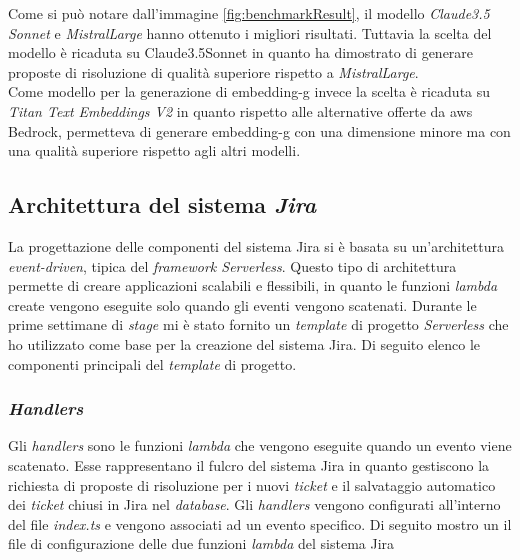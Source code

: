 Come si può notare dall'immagine \ref{fig:benchmarkResult}, il modello \textit{Claude3.5 Sonnet} e \textit{MistralLarge} hanno ottenuto i migliori risultati. Tuttavia la scelta del modello è ricaduta su Claude3.5Sonnet in quanto ha dimostrato di generare proposte di risoluzione di qualità superiore rispetto a \textit{MistralLarge}.\\
Come modello per la generazione di \gls{embedding-g} invece la scelta è ricaduta su \textit{Titan Text Embeddings V2} in quanto rispetto alle alternative offerte da \gls{aws} Bedrock, permetteva di generare \gls{embedding-g} con una dimensione minore ma con una qualità superiore rispetto agli altri modelli.

\subsection{Architettura del sistema \textit{Jira}}
La progettazione delle componenti del sistema Jira si è basata su un'architettura \textit{event-driven}, tipica del \textit{framework Serverless}. Questo tipo di architettura permette di creare applicazioni scalabili e flessibili, in quanto le funzioni \textit{lambda} create vengono eseguite solo quando gli eventi vengono scatenati. 
Durante le prime settimane di \textit{stage} mi è stato fornito un \textit{template} di progetto \textit{Serverless} che ho utilizzato come base per la creazione del sistema Jira. Di seguito elenco le componenti principali del \textit{template} di progetto.

\subsubsection{\textit{Handlers}}
Gli \textit{handlers} sono le funzioni \textit{lambda} che vengono eseguite quando un evento viene scatenato. Esse rappresentano il fulcro del sistema Jira in quanto gestiscono la richiesta di proposte di risoluzione per i nuovi \textit{ticket} e il salvataggio automatico dei \textit{ticket} chiusi in Jira nel \textit{database}. 
Gli \textit{handlers} vengono configurati all'interno del file \textit{index.ts} e vengono associati ad un evento specifico. Di seguito mostro un il file di configurazione delle due funzioni \textit{lambda} del sistema Jira

